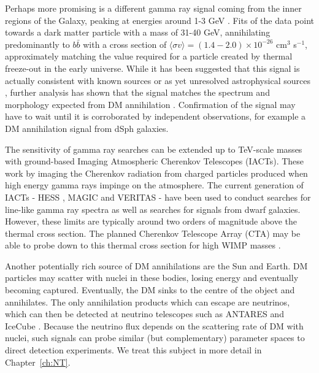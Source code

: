 Perhaps more promising is a different gamma ray signal coming from the inner regions of the Galaxy, peaking at energies around 1-3 GeV \cite{Goodenough:2009,Hooper:2011}. Fits of the data point towards a dark matter particle with a mass of 31-40 GeV, annihilating predominantly to $b\bar{b}$ with a cross section of $\langle \sigma v \rangle = (1.4-2.0) \times 10^{-26}$ cm$^3$ s$^{-1}$, approximately matching the value required for a particle created by thermal freeze-out in the early universe. While it has been suggested that this signal is actually consistent with known sources \cite{Boyarsky:2010} or as yet unresolved astrophysical sources \cite{Abazajian:2011}, further analysis has shown that the signal matches the spectrum and morphology expected from DM annihilation \cite{Daylan:2014}. Confirmation of the signal may have to wait until it is corroborated by independent observations, for example a DM annihilation signal from dSph galaxies.

The sensitivity of gamma ray searches can be extended up to TeV-scale masses with ground-based Imaging Atmospheric Cherenkov Telescopes (IACTs). These work by imaging the Cherenkov radiation from charged particles produced when high energy gamma rays impinge on the atmosphere. The current generation of IACTs - HESS \cite{Abramowski:2013}, MAGIC \cite{Aleksic:2014} and VERITAS \cite{Acciari:2010} - have been used to conduct searches for line-like gamma ray spectra as well as searches for signals from dwarf galaxies. However, these limits are typically around two orders of magnitude above the thermal cross section. The planned Cherenkov Telescope Array (CTA) may be able to probe down to this thermal cross section for high WIMP masses \cite{Doro:2013}.


Another potentially rich source of DM annihilations are the Sun and Earth. DM particles may scatter with nuclei in these bodies, losing energy and eventually becoming captured. Eventually, the DM sinks to the centre of the object and annihilates. The only annihilation products which can escape are neutrinos, which can then be detected at neutrino telescopes such as ANTARES \cite{Zornoza:2012} and IceCube \cite{Aartsen:2013b}. Because the neutrino flux depends on the scattering rate of DM with nuclei, such signals can probe similar (but complementary) parameter spaces to direct detection experiments. We treat this subject in more detail in Chapter~\ref{ch:NT}.




